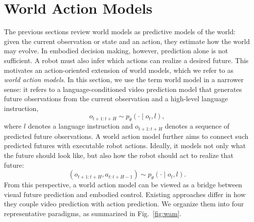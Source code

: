 \section{World Action Models}

The previous sections review world models as predictive models of the world: given the current observation or state and an action, they estimate how the world may evolve. In embodied decision making, however, prediction alone is not sufficient. A robot must also infer which actions can realize a desired future. This motivates an action-oriented extension of world models, which we refer to as \emph{world action models}. In this section, we use the term world model in a narrower sense: it refers to a language-conditioned video prediction model that generates future observations from the current observation and a high-level language instruction,
\[
o_{t+1:t+H} \sim p_\theta(\cdot \mid o_t, l),
\]
where $l$ denotes a language instruction and $o_{t+1:t+H}$ denotes a sequence of predicted future observations. A world action model further aims to connect such predicted futures with executable robot actions. Ideally, it models not only what the future should look like, but also how the robot should act to realize that future:
\[
(o_{t+1:t+H}, a_{t:t+H-1})
\sim p_\theta(\cdot \mid o_t, l).
\]
From this perspective, a world action model can be viewed as a bridge between visual future prediction and embodied control. Existing approaches differ in how they couple video prediction with action prediction. We organize them into four representative paradigms, as summarized in Fig.~\ref{fig:wam}.


